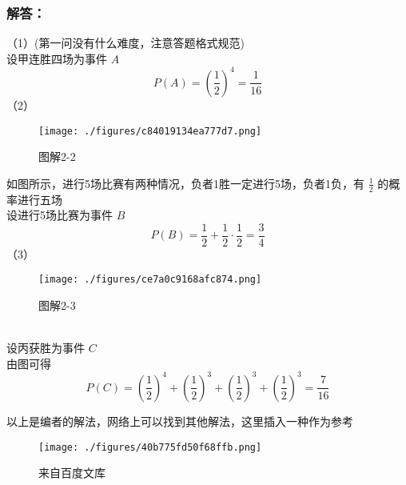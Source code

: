 \subsubsection{解答：}
（1）(第一问没有什么难度，注意答题格式规范)\\
设甲连胜四场为事件 $A$
\begin{equation}
P(A) = (\frac{1}{2})^4 = \frac{1}{16}
\end{equation}
（2）
\begin{figure}[ht]
\centering
\texttt{[image: ./figures/c84019134ea777d7.png]}
\caption{图解2-2} \label{fig_HsPbEc_1}
\end{figure}
如图所示，进行5场比赛有两种情况，负者1胜一定进行5场，负者1负，有 $\frac{1}{2}$ 的概率进行五场\\
设进行5场比赛为事件 $B$
\begin{equation}
P(B) = \frac{1}{2} + \frac{1}{2} \cdot \frac{1}{2} = \frac{3}{4}
\end{equation}
（3）
\begin{figure}[ht]
\centering
\texttt{[image: ./figures/ce7a0c9168afc874.png]}
\caption{图解2-3} \label{fig_HsPbEc_2}
\end{figure}\\
设丙获胜为事件 $C$\\
由图可得
\begin{equation}
P(C) = (\frac{1}{2})^4 + (\frac{1}{2})^3 + (\frac{1}{2})^3 + (\frac{1}{2})^3 = \frac{7}{16}
\end{equation}

以上是编者的解法，网络上可以找到其他解法，这里插入一种作为参考
\begin{figure}[ht]
\centering
\texttt{[image: ./figures/40b775fd50f68ffb.png]}
\caption{来自百度文库} \label{fig_HsPbEc_3}
\end{figure}